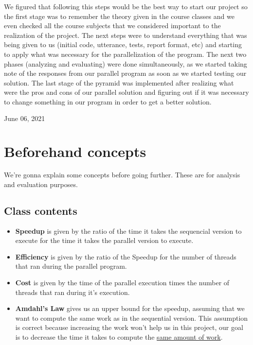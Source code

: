 \documentclass[10pt,journal,compsoc]{IEEEtran}
\begin{document}
We figured that following this steps would be the best way to start our project so the first stage was to remember the theory given in the course classes and we even checked all the course subjects that we considered important to the realization of the project. The next steps were to understand everything that was being given to us (initial code, utterance, tests, report format, etc) and starting to apply what was necessary for the parallelization of the program. The next two phases (analyzing and evaluating) were done simultaneously, as we started taking note of the responses from our parallel program as soon as we started testing our solution. The last stage of the pyramid was implemented after realizing what were the pros and cons of our parallel solution and figuring out if it was necessary to change something in our program in order to get a better solution.

\hfill June 06, 2021

\section{Beforehand concepts}
We're gonna explain some concepts before going further. These are for analysis and evaluation purposes.

\subsection{Class contents}
\begin{itemize}
    \item \textbf{Speedup} is given by the ratio of the time it takes the sequencial version to execute for the time it takes the parallel version to execute.
    \item \textbf{Efficiency} is given by the ratio of the Speedup for the number of threads that ran during the parallel program.
    \item \textbf{Cost} is given by the time of the parallel execution times the number of threads that ran during it's execution.
    \item \textbf{Amdahl's Law} gives us an upper bound for the speedup, assuming that we want to compute the same work as in the sequential version. This assumption is correct because increasing the work won't help us in this project, our goal is to decrease the time it takes to compute the \underline{same amount of work}.
\end{itemize}
\end{document}
